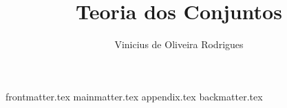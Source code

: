 ﻿\documentclass{book}
\title{Teoria dos Conjuntos}
\author{Vinicius de Oliveira Rodrigues}
\theoremstyle{definition}
\theoremstyle{namedaxiom}
\begin{document}
    {frontmatter.tex}
    {mainmatter.tex}
    {appendix.tex}
    {backmatter.tex}
\end{document}

